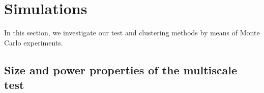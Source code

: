\documentclass[12pt]{article}
\begin{document}
\def\spacingset#1{\renewcommand{\baselinestretch}%
{#1}\small\normalsize} \spacingset{1}



\spacingset{1.8} %

\def\thesection{\Alph{section}}

\allowdisplaybreaks[4]

\setlength{\abovedisplayskip}{3pt}
\setlength{\belowdisplayskip}{3pt}



\section{Simulations}\label{sec:sim}


In this section, we investigate our test and clustering methods by means of Monte Carlo experiments.


\subsection{Size and power properties of the multiscale test}\label{subsec:sim:main} 
\end{document}
